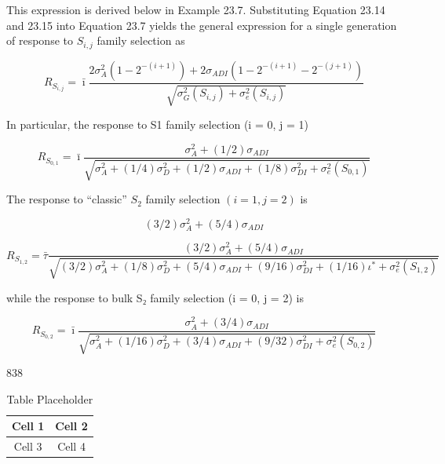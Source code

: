 \documentclass{article}
\begin{document}
This expression is derived below in Example 23.7. Substituting Equation 23.14 and 23.15 into Equation 23.7 yields the general expression for a single generation of response to  $ S_{i,j} $ family selection as

\begin{equation}
R_{S_{i,j}}=\bar{\imath}\frac{2\sigma_{A}^{2}(1-2^{-(i+1)})+2\sigma_{ADI}(1-2^{-(i+1)}-2^{-(j+1)})}{\sqrt{\sigma_{G}^{2}(S_{i,j})+\sigma_{e}^{2}(S_{i,j})}}
\tag{23.16}
\label{eq:23_16}
\end{equation}

In particular, the response to S1 family selection (i = 0, j = 1)

\begin{equation}
R_{S_{0,1}}=\bar{\imath}\frac{\sigma_{A}^{2}+(1/2)\sigma_{ADI}}{\sqrt{\sigma_{A}^{2}+(1/4)\sigma_{D}^{2}+(1/2)\sigma_{ADI}+(1/8)\sigma_{DI}^{2}+\sigma_{e}^{2}(S_{0,1})}}
\tag{23.17a}
\label{eq:23_17a}
\end{equation}

The response to “classic”  $ S_{2} $ family selection  $ (i = 1, j = 2) $ is

\begin{equation}
(3/2)\sigma_{A}^{2}+(5/4)\sigma_{A D I}
\end{equation}

\begin{equation}
R_{S_{1,2}}=\bar{\tau}\frac{(3/2)\sigma_{A}^{2}+(5/4)\sigma_{ADI}}{\sqrt{(3/2)\sigma_{A}^{2}+(1/8)\sigma_{D}^{2}+(5/4)\sigma_{ADI}+(9/16)\sigma_{DI}^{2}+(1/16)\iota^{*}+\sigma_{e}^{2}(S_{1,2})}}
\tag{23.17b}
\label{eq:23_17b}
\end{equation}

while the response to bulk S₂ family selection (i = 0, j = 2) is

\begin{equation}
R_{S_{0,2}}=\bar{\imath}\frac{\sigma_{A}^{2}+(3/4)\sigma_{ADI}}{\sqrt{\sigma_{A}^{2}+(1/16)\sigma_{D}^{2}+(3/4)\sigma_{ADI}+(9/32)\sigma_{DI}^{2}+\sigma_{e}^{2}(S_{0,2})}}
\tag{23.17c}
\label{eq:23_17c}
\end{equation}

838

\begin{table}[h]
\centering
\begin{tabular}{|c|c|}
\hline
Cell 1 & Cell 2 \\
\hline
Cell 3 & Cell 4 \\
\hline
\end{tabular}
\caption{Table Placeholder}
\end{table}
\end{document}
